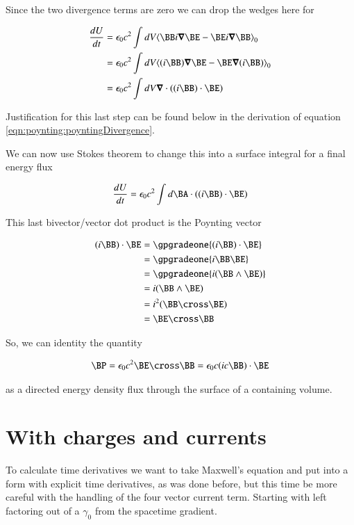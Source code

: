 Since the two divergence terms are zero we can drop the wedges here for

\begin{align*}
\frac{dU}{dt} 
&= \epsilon_0 c^2 \int dV \gpgradezero{ \BB i \spacegrad \BE -\BE i \spacegrad \BB } \\
&= \epsilon_0 c^2 \int dV \gpgradezero{ (i \BB) \spacegrad \BE -\BE \spacegrad (i\BB) } \\
&= \epsilon_0 c^2 \int dV \spacegrad \cdot ( (i \BB) \cdot \BE ) \\
\end{align*}

Justification for this last step can be found below in the derivation of equation \ref{eqn:poynting:poyntingDivergence}.

We can now use Stokes theorem to change this into a surface integral for a final energy flux 

\begin{align*}
\frac{dU}{dt} 
&= \epsilon_0 c^2 \int d\BA \cdot ( (i \BB) \cdot \BE ) \\
\end{align*}

This last bivector/vector dot product is the Poynting vector

\begin{align*}
(i \BB) \cdot \BE 
&= \gpgradeone{ (i \BB) \cdot \BE } \\
&= \gpgradeone{ i \BB \BE } \\
&= \gpgradeone{ i (\BB \wedge \BE) } \\
&= i (\BB \wedge \BE) \\
&= i^2(\BB \cross \BE) \\
&= \BE \cross \BB \\
\end{align*}

So, we can identity the quantity 

\begin{align}\label{eqn:poynting:poynting}
\BP = \epsilon_0 c^2 \BE \cross \BB = \epsilon_0 c (i c \BB) \cdot \BE 
\end{align}

as a directed energy density flux through the surface of a containing volume.

\section{With charges and currents }
 
To calculate time derivatives we want to take Maxwell's equation and put into a form with explicit time derivatives, as was done before, but this time be more careful with the handling of the four vector current term.  Starting with left factoring out of a $\gamma_0$ from the spacetime gradient. 
 
